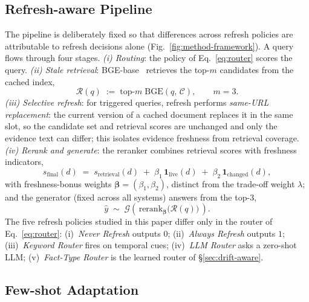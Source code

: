 \documentclass[pdflatex,sn-basic]{sn-jnl}
\providecommand{\mathbbm}[1]{\mathbf{#1}}
\begin{document}
\subsection{Refresh-aware Pipeline}
\label{sec:method-pipeline}

The pipeline is deliberately fixed so that differences across refresh policies are attributable to refresh decisions alone (Fig.~\ref{fig:method-framework}). A query flows through four stages. \emph{(i) Routing}: the policy of Eq.~\eqref{eq:router} scores the query. \emph{(ii) Stale retrieval}: BGE-base~\cite{bge2023} retrieves the top-$m$ candidates from the cached index,
\begin{equation}
\label{eq:retrieval}
\mathcal{R}(q) \;:=\; \mathrm{top}\text{-}m\;\mathrm{BGE}(q,\,\mathcal{C}), \qquad m = 3.
\end{equation}
\emph{(iii) Selective refresh}: for triggered queries, refresh performs \emph{same-URL replacement}: the current version of a cached document replaces it in the same slot, so the candidate set and retrieval scores are unchanged and only the evidence text can differ; this isolates evidence freshness from retrieval coverage. \emph{(iv) Rerank and generate}: the reranker combines retrieval scores with freshness indicators,
\begin{equation}
\label{eq:rerank}
s_{\mathrm{final}}(d) \;=\; s_{\mathrm{retrieval}}(d) \;+\; \beta_1\,\mathbbm{1}_{\mathrm{live}}(d) \;+\; \beta_2\,\mathbbm{1}_{\mathrm{changed}}(d),
\end{equation}
with freshness-bonus weights $\boldsymbol\beta = (\beta_1, \beta_2)$, distinct from the trade-off weight $\lambda$; and the generator (fixed across all systems) answers from the top-3,
\begin{equation}
\label{eq:generate}
\hat y \;\sim\; \mathcal{G}\!\left(\,\mathrm{rerank}_{\boldsymbol\beta}\!\big(\mathcal{R}(q)\big)\,\right).
\end{equation}
The five refresh policies studied in this paper differ only in the router of Eq.~\eqref{eq:router}: (i)~\emph{Never Refresh} outputs $0$; (ii)~\emph{Always Refresh} outputs $1$; (iii)~\emph{Keyword Router} fires on temporal cues; (iv)~\emph{LLM Router} asks a zero-shot LLM; (v)~\emph{Fact-Type Router} is the learned router of §\ref{sec:drift-aware}.

\subsection{Few-shot Adaptation}
\label{sec:adapt-objective}
\end{document}
